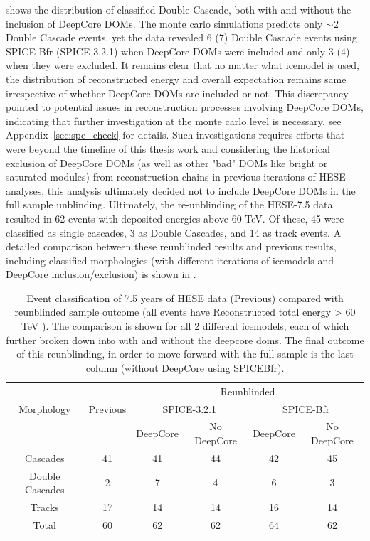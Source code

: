  shows the distribution of classified Double Cascade, both with and without the inclusion of DeepCore DOMs. The monte carlo simulations predicts only $\sim 2$ Double Cascade events, yet the data revealed 6 (7) Double Cascade events using SPICE-Bfr (SPICE-3.2.1) when DeepCore DOMs were included and only 3 (4) when they were excluded. It remains clear that no matter what icemodel is used, the distribution of reconstructed energy and overall expectation remains same irrespective of whether DeepCore DOMs are included or not. This discrepancy pointed to potential issues in reconstruction processes involving DeepCore DOMs, indicating that further investigation at the monte carlo level is necessary, see Appendix~\ref{sec:spe_check} for details. Such investigations requires efforts that were beyond the timeline of this thesis work and  considering the historical exclusion of DeepCore DOMs (as well as other "bad" DOMs like bright or saturated modules) from reconstruction chains in previous iterations of HESE analyses, this analysis ultimately decided not to include DeepCore DOMs in the full sample unblinding. Ultimately, the re-unblinding of the HESE-7.5 data resulted in 62 events with deposited energies above 60 TeV. Of these, 45 were classified as single cascades, 3 as Double Cascades, and 14 as track events. A detailed comparison between these  reunblinded results and previous results, including classified morphologies (with different iterations of icemodels and DeepCore inclusion/exclusion) is shown in .

\begin{table}[h]
    \caption[Event classification of 7.5 years of HESE data]{Event classification of 7.5 years of HESE data (Previous) compared with reunblinded sample outcome (all events have Reconstructed total energy > 60 TeV ). The comparison is shown for all 2 different icemodels, each of which further broken down into with and without the deepcore doms. The final outcome of this reunblinding, in order to move forward with the full sample is the last column (without DeepCore using SPICEBfr).}
    \raggedright
    \begin{tabular}{ c|c|c c |cc}
        \toprule
            & & \multicolumn{4}{c}{Reunblinded}\\
            
           Morphology&Previous & \multicolumn{2}{c|}{SPICE-3.2.1} & \multicolumn{2}{c}{SPICE-Bfr}\\
           
                     &   & DeepCore & No DeepCore & DeepCore & No DeepCore\\
                                
        \hline
        Cascades & 41 & 41 & 44 &42&45 \\
        Double Cascades & 2 & 7 &4&6& 3 \\
        Tracks& 17&14&14&16&14\\
        \hline
        Total & 60 & 62 &62&64&62\\
        \bottomrule
\end{tabular}
\end{table}


